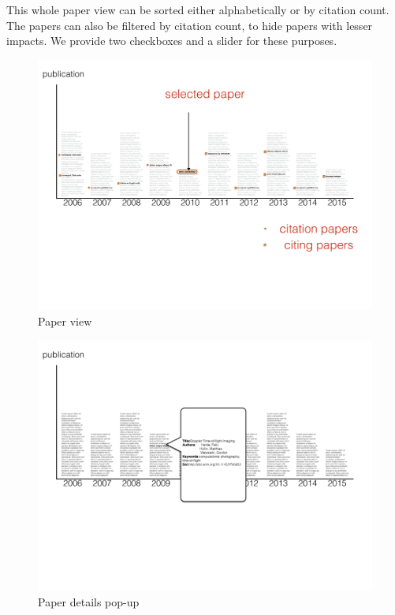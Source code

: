 \documentclass[dvips,12pt]{article}
\begin{document}
This whole paper view can be sorted either alphabetically or by citation count. The papers can also be filtered by citation count, to hide papers with lesser impacts. We provide two checkboxes and a slider for these purposes.

\begin{figure}[htb!]
    \centering
    \includegraphics[width=160mm]{visproposalDrawing_page_Part_2.pdf}
    \caption{Paper view}
    \label{fig:paper_view}
\end{figure}

\begin{figure}[htb!]
    \centering
    \includegraphics[width=160mm]{visproposalDrawing_page_Part_8.pdf}
    \caption{Paper details pop-up}
    \label{fig:pop-up}
\end{figure}
\end{document}
